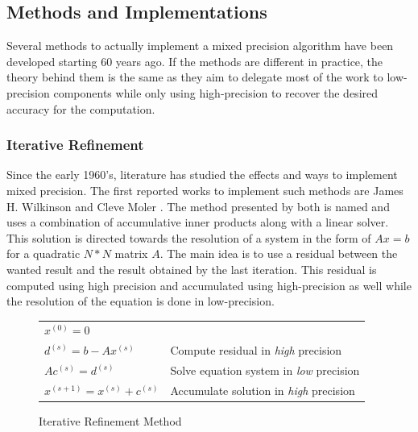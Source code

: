 \subsection{Methods and Implementations}
Several methods to actually implement a mixed precision algorithm have been developed starting 60 years ago. If the methods are different in practice, the theory behind them is the same as they aim to delegate most of the work to low-precision components while only using high-precision to recover the desired accuracy for the computation.
\subsubsection{Iterative Refinement}

Since the early 1960's, literature has studied the effects and ways to implement mixed precision. The first reported works to implement such methods are James H. Wilkinson \cite{Wilkinson1994} and Cleve Moler \cite{Moler1967}. The method presented by both is named  and uses a combination of accumulative inner products along with a linear solver. This solution is directed towards the resolution of a system in the form of $Ax=b$ for a quadratic $N*N$ matrix $A$. The main idea is to use a residual between the wanted result and the result obtained by the last iteration. This residual is computed using high precision and accumulated using high-precision as well while the resolution of the equation is done in low-precision.

\begin{figure}[htbp]
	\centering
\begin{tabular}{ll}
	$x^{(0)}=0$ &\\
	$d^{(s)}=b-Ax^{(s)}$ & Compute residual in \emph{high} precision\\
	$Ac^{(s)}=d^{(s)}$ & Solve equation system in \emph{low} precision\\
	$x^{(s+1)}=x^{(s)}+c^{(s)}$ & Accumulate solution in \emph{high} precision\\
\end{tabular}
	\caption[Iterative Refinement]{Iterative Refinement Method \cite{Goddeke2007}}
	\label{fig:IterativeRef}
\end{figure}

